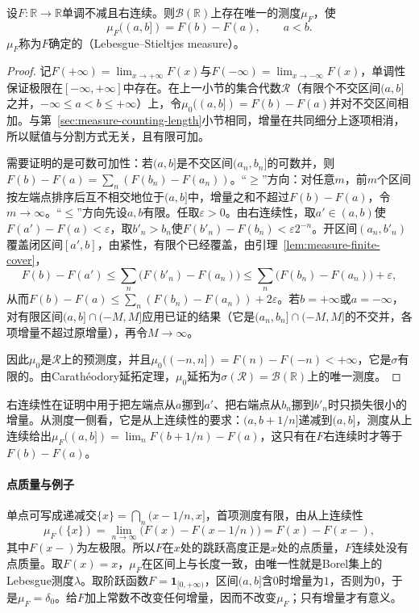 \begin{theorem}
\label{thm:measure-stieltjes}
设$F:\mathbb R\to\mathbb R$单调不减且右连续。则$\mathcal B(\mathbb R)$上存在唯一的测度$\mu_F$，使
\[
 \mu_F((a,b])=F(b)-F(a),\qquad a<b.
\]
$\mu_F$称为$F$确定的（Lebesgue--Stieltjes measure）。
\end{theorem}

\begin{proof}
记$F(+\infty)=\lim_{x\to+\infty}F(x)$与$F(-\infty)=\lim_{x\to-\infty}F(x)$，单调性保证极限在$[-\infty,+\infty]$中存在。在上一小节的集合代数$\mathcal R$（有限个不交区间$(a,b]$之并，$-\infty\le a<b\le+\infty$）上，令$\mu_0((a,b])=F(b)-F(a)$并对不交区间相加。与第~\ref{sec:measure-counting-length}小节相同，增量在共同细分上逐项相消，所以赋值与分割方式无关，且有限可加。

需要证明的是可数可加性：若$(a,b]$是不交区间$(a_n,b_n]$的可数并，则$F(b)-F(a)=\sum_n(F(b_n)-F(a_n))$。“$\ge$”方向：对任意$m$，前$m$个区间按左端点排序后互不相交地位于$(a,b]$中，增量之和不超过$F(b)-F(a)$，令$m\to\infty$。“$\le$”方向先设$a,b$有限。任取$\varepsilon>0$。由右连续性，取$a'\in(a,b)$使$F(a')-F(a)<\varepsilon$，取$b'_n>b_n$使$F(b'_n)-F(b_n)<\varepsilon2^{-n}$。开区间$(a_n,b'_n)$覆盖闭区间$[a',b]$，由紧性，有限个已经覆盖，由引理~\ref{lem:measure-finite-cover}，
\[
 F(b)-F(a')\le\sum_n\bigl(F(b'_n)-F(a_n)\bigr)\le\sum_n\bigl(F(b_n)-F(a_n)\bigr)+\varepsilon,
\]
从而$F(b)-F(a)\le\sum_n(F(b_n)-F(a_n))+2\varepsilon$。若$b=+\infty$或$a=-\infty$，对有限区间$(a,b]\cap(-M,M]$应用已证的结果（它是$(a_n,b_n]\cap(-M,M]$的不交并，各项增量不超过原增量），再令$M\to\infty$。

因此$\mu_0$是$\mathcal R$上的预测度，并且$\mu_0((-n,n])=F(n)-F(-n)<+\infty$，它是$\sigma$有限的。由Carathéodory延拓定理，$\mu_0$延拓为$\sigma(\mathcal R)=\mathcal B(\mathbb R)$上的唯一测度。
\end{proof}

右连续性在证明中用于把左端点从$a$挪到$a'$、把右端点从$b_n$挪到$b'_n$时只损失很小的增量。从测度一侧看，它是从上连续性的要求：$(a,b+1/n]$递减到$(a,b]$，测度从上连续给出$\mu_F((a,b])=\lim_nF(b+1/n)-F(a)$，这只有在$F$右连续时才等于$F(b)-F(a)$。

\paragraph{点质量与例子}
单点可写成递减交$\{x\}=\bigcap_n(x-1/n,x]$，首项测度有限，由从上连续性
\[
 \mu_F(\{x\})=\lim_{n\to\infty}\bigl(F(x)-F(x-1/n)\bigr)=F(x)-F(x-),
\]
其中$F(x-)$为左极限。所以$F$在$x$处的跳跃高度正是$x$处的点质量，$F$连续处没有点质量。取$F(x)=x$，$\mu_F$在区间上与长度一致，由唯一性就是Borel集上的Lebesgue测度$\lambda$。取阶跃函数$F=\mathbf 1_{[0,+\infty)}$，区间$(a,b]$含$0$时增量为$1$，否则为$0$，于是$\mu_F=\delta_0$。给$F$加上常数不改变任何增量，因而不改变$\mu_F$；只有增量才有意义。

